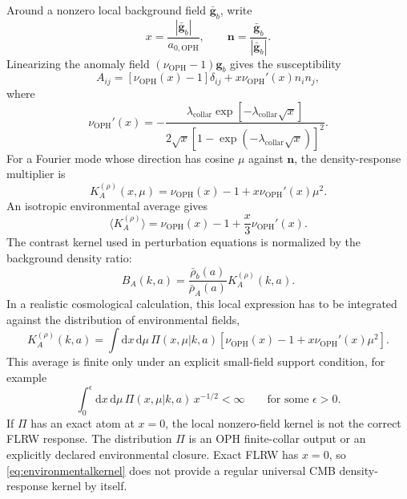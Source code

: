 \documentclass[11pt]{article}
\newcommand{\OPH}{\mathrm{OPH}}
\newcommand{\aoph}{a_{0,\mathrm{OPH}}}
\newcommand{\lambdac}{\lambda_{\mathrm{collar}}}
\newcommand{\dd}{\mathrm{d}}
\begin{document}
Around a nonzero local background field
\(\bar{\mathbf g}_b\), write
\begin{equation}
  x=\frac{|\bar{\mathbf g}_b|}{\aoph},
  \qquad
  \mathbf n=\frac{\bar{\mathbf g}_b}{|\bar{\mathbf g}_b|}.
\end{equation}
Linearizing the anomaly field
\((\nu_{\OPH}-1)\mathbf g_b\) gives the susceptibility
\begin{equation}
  A_{ij}
  =
  [\nu_{\OPH}(x)-1]\delta_{ij}
  +x\nu_{\OPH}'(x)n_i n_j,
\end{equation}
where
\begin{equation}
  \nu_{\OPH}'(x)
  =
  -\frac{
    \lambdac\exp[-\lambdac\sqrt{x}]
  }{
    2\sqrt{x}[1-\exp(-\lambdac\sqrt{x})]^2
  }.
\end{equation}
For a Fourier mode whose direction has cosine \(\mu\) against \(\mathbf n\),
the density-response multiplier is
\begin{equation}
  K_A^{(\rho)}(x,\mu)
  =
  \nu_{\OPH}(x)-1+x\nu_{\OPH}'(x)\mu^2.
  \label{eq:environmentalkernel}
\end{equation}
An isotropic environmental average gives
\begin{equation}
  \langle K_A^{(\rho)}\rangle
  =
  \nu_{\OPH}(x)-1+\frac{x}{3}\nu_{\OPH}'(x).
\end{equation}
The contrast kernel used in perturbation equations is normalized by the
background density ratio:
\begin{equation}
  B_A(k,a)
  =
  \frac{\bar\rho_b(a)}{\bar\rho_A(a)}K_A^{(\rho)}(k,a).
\end{equation}
In a realistic cosmological calculation, this local expression has to be
integrated against the distribution of environmental fields,
\begin{equation}
  K_A^{(\rho)}(k,a)
  =
  \int\dd x\,\dd\mu\,
  \Pi(x,\mu|k,a)
  [\nu_{\OPH}(x)-1+x\nu_{\OPH}'(x)\mu^2].
\end{equation}
This average is finite only under an explicit small-field support condition,
for example
\begin{equation}
  \int_0^\epsilon \dd x\,\dd\mu\,
  \Pi(x,\mu|k,a)\,x^{-1/2}<\infty
  \qquad
  \text{for some }\epsilon>0.
\end{equation}
If \(\Pi\) has an exact atom at \(x=0\), the local nonzero-field kernel is not
the correct FLRW response.
The distribution \(\Pi\) is an OPH finite-collar output or an explicitly
declared environmental closure.  Exact FLRW has \(x=0\), so
\eqref{eq:environmentalkernel} does not provide a regular universal CMB
density-response kernel by itself.
\end{document}
